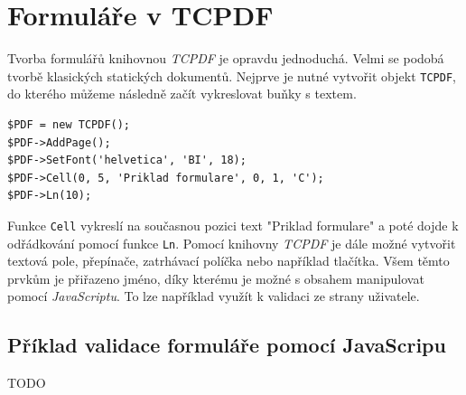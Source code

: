 \documentclass[czech,BP]{thesiskiv}
\begin{document}
\section{Formuláře v TCPDF}
Tvorba formulářů knihovnou \emph{TCPDF} je opravdu jednoduchá. Velmi se podobá tvorbě klasických statických dokumentů. Nejprve je nutné vytvořit objekt \texttt{TCPDF}, do kterého můžeme následně začít vykreslovat buňky s textem.
\begin{lstlisting}
$PDF = new TCPDF();
$PDF->AddPage();
$PDF->SetFont('helvetica', 'BI', 18);
$PDF->Cell(0, 5, 'Priklad formulare', 0, 1, 'C');
$PDF->Ln(10);
\end{lstlisting}
Funkce \texttt{Cell} vykreslí na současnou pozici text "Priklad formulare" a poté dojde k odřádkování pomocí funkce \texttt{Ln}. Pomocí knihovny \emph{TCPDF} je dále možné vytvořit textová pole, přepínače, zatrhávací políčka nebo například tlačítka. Všem těmto prvkům je přiřazeno jméno, díky kterému je možné s obsahem manipulovat pomocí \emph{JavaScriptu}. To lze například využít k validaci ze strany uživatele. 
\subsection{Příklad validace formuláře pomocí JavaScripu}
TODO
\end{document}
